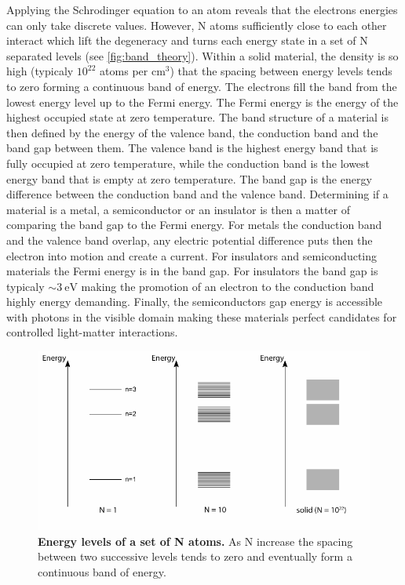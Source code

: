 Applying the Schrodinger equation to an atom reveals that the electrons energies can only take discrete values. However, N atoms sufficiently close to each other interact which lift the degeneracy and 
turns each energy state in a set of N separated levels (see \autoref{fig:band_theory}). 
Within a solid material, the density is so high (typicaly $10^{22}$ atoms per cm$^3$) that the spacing between energy levels tends to zero forming a continuous band of energy. 
The electrons fill the band from the lowest energy level up to the Fermi energy. The Fermi energy is the energy of the highest occupied state at zero temperature. 
The band structure of a material is then defined by the energy of the valence band, the conduction band and the band gap between them. The valence band is the highest energy band that is fully occupied at zero temperature, while the conduction band is the lowest energy band that is empty at zero temperature. The band gap is the energy difference between the conduction band and the valence band. 
Determining if a material is a metal, a semiconductor or an insulator is then a matter of comparing the band gap to the Fermi energy.
For metals the conduction band and the valence band overlap, any electric potential difference puts then the electron into motion and create a current. For insulators and semiconducting materials the Fermi energy is in the band gap. For insulators the band gap is typicaly $\sim 3 \ \mathrm{eV}$ making the promotion of an electron to the conduction band highly energy demanding. 
Finally, the semiconductors gap energy is accessible with photons in the visible domain making these materials perfect candidates for controlled light-matter interactions.

\begin{figure}[h]
    \centering
    \includegraphics[width=1\linewidth]{chap1/fig/band_theory.pdf}
    \caption{\textbf{Energy levels of a set of N atoms.} As N increase the spacing between two successive levels tends to zero and eventually form a continuous band of energy.}
    \label{fig:band_theory}
\end{figure}

